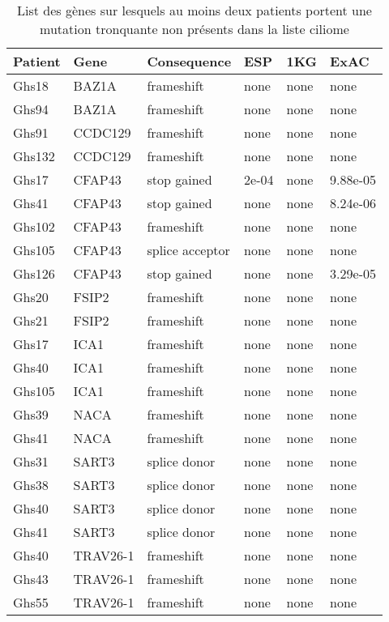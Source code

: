 \documentclass[12pt,twoside]{reedthesis}
\theoremstyle{definition}
\theoremstyle{definition}
\theoremstyle{remark}
\begin{document}
  \begin{longtable}[t]{llllll}
  \caption{\label{tab:tabgrp2high}List des gènes sur lesquels au moins deux patients portent une mutation tronquante non présents dans la liste ciliome }\\
  \toprule
  Patient & Gene & Consequence & ESP & 1KG & ExAC\\
  \midrule
  Ghs18 & BAZ1A & frameshift & none & none & none\\
  Ghs94 & BAZ1A & frameshift & none & none & none\\
  Ghs91 & CCDC129 & frameshift & none & none & none\\
  Ghs132 & CCDC129 & frameshift & none & none & none\\
  Ghs17 & CFAP43 & stop gained & 2e-04 & none & 9.88e-05\\
  \addlinespace
  Ghs41 & CFAP43 & stop gained & none & none & 8.24e-06\\
  Ghs102 & CFAP43 & frameshift & none & none & none\\
  Ghs105 & CFAP43 & splice acceptor & none & none & none\\
  Ghs126 & CFAP43 & stop gained & none & none & 3.29e-05\\
  Ghs20 & FSIP2 & frameshift & none & none & none\\
  \addlinespace
  Ghs21 & FSIP2 & frameshift & none & none & none\\
  Ghs17 & ICA1 & frameshift & none & none & none\\
  Ghs40 & ICA1 & frameshift & none & none & none\\
  Ghs105 & ICA1 & frameshift & none & none & none\\
  Ghs39 & NACA & frameshift & none & none & none\\
  \addlinespace
  Ghs41 & NACA & frameshift & none & none & none\\
  Ghs31 & SART3 & splice donor & none & none & none\\
  Ghs38 & SART3 & splice donor & none & none & none\\
  Ghs40 & SART3 & splice donor & none & none & none\\
  Ghs41 & SART3 & splice donor & none & none & none\\
  \addlinespace
  Ghs40 & TRAV26-1 & frameshift & none & none & none\\
  Ghs43 & TRAV26-1 & frameshift & none & none & none\\
  Ghs55 & TRAV26-1 & frameshift & none & none & none\\
  \bottomrule
  \end{longtable}
  
\end{document}
